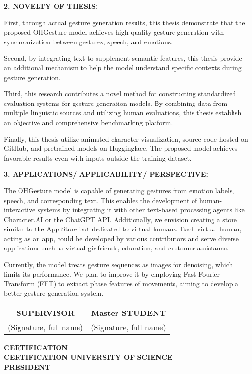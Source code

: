 \vspace{5pt}
{\MakeUppercase\Large \bfseries 2. NOVELTY OF THESIS:}


First, through actual gesture generation results, this thesis demonstrate that the proposed OHGesture model achieves high-quality gesture generation with synchronization between gestures, speech, and emotions.

Second, by integrating text to supplement semantic features, this thesis provide an additional mechanism to help the model understand specific contexts during gesture generation.

Third, this research contributes a novel method for constructing standardized evaluation systems for gesture generation models. By combining data from multiple linguistic sources and utilizing human evaluations, this thesis establish an objective and comprehensive benchmarking platform.

Finally, this thesis utilize animated character visualization, source code hosted on GitHub, and pretrained models on Huggingface. The proposed model achieves favorable results even with inputs outside the training dataset.

\vspace{5pt}
{\MakeUppercase\Large \bfseries 3. APPLICATIONS/ APPLICABILITY/ PERSPECTIVE:}

The OHGesture model is capable of generating gestures from emotion labels, speech, and corresponding text. This enables the development of human-interactive systems by integrating it with other text-based processing agents like Character.AI or the ChatGPT API. Additionally, we envision creating a store similar to the App Store but dedicated to virtual humans. Each virtual human, acting as an app, could be developed by various contributors and serve diverse applications such as virtual girlfriends, education, and customer assistance.

Currently, the model treats gesture sequences as images for denoising, which limits its performance. We plan to improve it by employing Fast Fourier Transform (FFT) to extract phase features of movements, aiming to develop a better gesture generation system.

\begin{center}
    \begin{tabular}{c c}
        \textbf{SUPERVISOR} & \textbf{Master STUDENT} \\
        (Signature, full name) & (Signature, full name) \\
    \end{tabular}
    
    \vspace{2.5cm} %
    
    \textbf{CERTIFICATION} \\
    \textbf{CERTIFICATION UNIVERSITY OF SCIENCE} \\
    \textbf{PRESIDENT}
\end{center}

\pagebreak